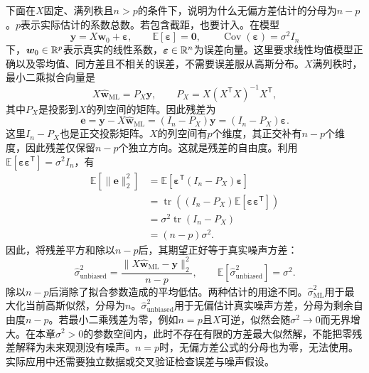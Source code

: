 下面在$X$固定、满列秩且$n>p$的条件下，说明为什么无偏方差估计的分母为$n-p$。$p$表示实际估计的系数总数。若包含截距，也要计入。在模型
\begin{equation} 
 \bm y=X\bm w_0+\bm\varepsilon,
 \qquad
 \mathbb E[\bm\varepsilon]=\bm0,
 \qquad
 \operatorname{Cov}(\bm\varepsilon)=\sigma^2I_n
\end{equation}
下，$\bm w_0\in\mathbb{R}^p$表示真实的线性系数，$\bm\varepsilon\in\mathbb{R}^n$为误差向量。这里要求线性均值模型正确以及零均值、同方差且不相关的误差，不需要误差服从高斯分布。$X$满列秩时，最小二乘拟合向量是
\begin{equation}
 X\hat{\bm w}_{\mathrm{ML}}=P_X\bm y,
 \qquad
 P_X=X(X^{\mathsf T}X)^{-1}X^{\mathsf T},
\end{equation}
其中$P_X$是投影到$X$的列空间的矩阵。因此残差为
\begin{equation}
 \bm e=\bm y-X\hat{\bm w}_{\mathrm{ML}}
 =(I_n-P_X)\bm y
 =(I_n-P_X)\bm\varepsilon.
\end{equation}
这里$I_n-P_X$也是正交投影矩阵。$X$的列空间有$p$个维度，其正交补有$n-p$个维度，因此残差仅保留$n-p$个独立方向。这就是残差的自由度。利用$\mathbb E[\bm\varepsilon\bm\varepsilon^{\mathsf T}]=\sigma^2I_n$，有
\begin{align}
 \mathbb E[\|\bm e\|_2^2]
 &=\mathbb E[\bm\varepsilon^{\mathsf T}(I_n-P_X)\bm\varepsilon]\\
 &=\operatorname{tr}\left((I_n-P_X)\mathbb E[\bm\varepsilon\bm\varepsilon^{\mathsf T}]\right)\\
 &=\sigma^2\operatorname{tr}(I_n-P_X)\\
 &=(n-p)\sigma^2.
 \label{eq:linear-residual-sum-expectation}
\end{align}
因此，将残差平方和除以$n-p$后，其期望正好等于真实噪声方差：
\begin{equation}
 \hat\sigma^2_{\mathrm{unbiased}}
 =\frac{\|X\hat{\bm w}_{\mathrm{ML}}-\bm y\|_2^2}{n-p},
 \qquad
 \mathbb E[\hat\sigma^2_{\mathrm{unbiased}}]=\sigma^2.
 \label{eq:linear-noise-variance-unbiased}
\end{equation}
除以$n-p$后消除了拟合参数造成的平均低估。两种估计的用途不同。$\hat\sigma^2_{\mathrm{ML}}$用于最大化当前高斯似然，分母为$n$。$\hat\sigma^2_{\mathrm{unbiased}}$用于无偏估计真实噪声方差，分母为剩余自由度$n-p$。若最小二乘残差为零，例如$n=p$且$X$可逆，似然会随$\sigma^2\to0$而无界增大。在本章$\sigma^2>0$的参数空间内，此时不存在有限的方差最大似然解，不能把零残差解释为未来观测没有噪声。$n=p$时，无偏方差公式的分母也为零，无法使用。实际应用中还需要独立数据或交叉验证检查误差与噪声假设。

